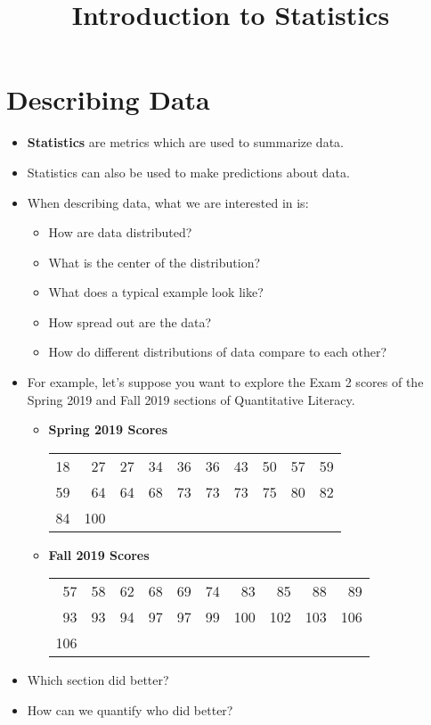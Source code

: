 \documentclass{article}
\title{Introduction to Statistics}
\date{}
\begin{document}
\maketitle

\section{Describing Data}
\begin{itemize}
    \item \textbf{Statistics} are metrics which are used to summarize data.
    \item Statistics can also be used to make predictions about data.
    \item When describing data, what we are interested in is:
    \begin{itemize}
        \item How are data distributed?
        \item What is the center of the distribution?
        \item What does a typical example look like?
        \item How spread out are the data?
        \item How do different distributions of data compare to each other?
    \end{itemize}
    \item For example, let's suppose you want to explore the Exam 2 scores of the 
        Spring 2019 and Fall 2019 sections of Quantitative Literacy.
        \begin{itemize}
            \item \textbf{Spring 2019 Scores}
            \newline\begin{tabular}{rrrrrrrrrr}
            18 & 27 & 27 & 34 & 36 & 36 & 43 & 50 & 57 & 59\\
            59 & 64 & 64 & 68 & 73 & 73 & 73 & 75 & 80 & 82\\
            84 & 100\\
            \end{tabular}

            \item \textbf{Fall 2019 Scores}
            \newline\begin{tabular}{rrrrrrrrrr}
            57 & 58 & 62 & 68 & 69 & 74 & 83 & 85 & 88 & 89 \\
            93 & 93 & 94 & 97 & 97 & 99 & 100 & 102 & 103 & 106\\
            106 \\
            \end{tabular}
        \end{itemize}
    \item Which section did better?
    \item How can we quantify who did better?
\end{itemize}
\end{document}
